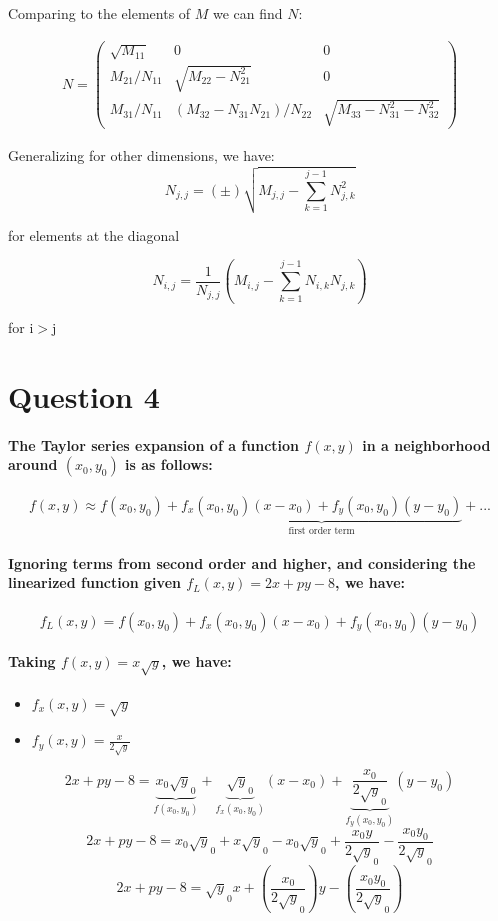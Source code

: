 \documentclass[a4paper]{article}    %
\begin{document}
Comparing to the elements of $M$ we can find $N$:

\begin{align*}
    N = 
    \begin{pmatrix} \sqrt{M_{11}} &  0 & 0  \\
    M_{21}/N_{11} & \sqrt{M_{22} - N_{21}^2} & 0 \\
    M_{31}/N_{11} &  \left( M_{32} - N_{31}N_{21} \right) /N_{22}  &\sqrt{M_{33}- N_{31}^2 - N_{32}^2}
    \end{pmatrix}
\end{align*}

Generalizing for other dimensions, we have:
\[\boxed{N_{j,j} = (\pm)\sqrt{ M_{j,j} - \sum_{k=1}^{j-1} N_{j,k}^2 }}\]
\begin{center}for elements at the diagonal\end{center}

\[\boxed{N_{i,j} = \frac{1}{N_{j,j}} \left( M_{i,j} - \sum_{k=1}^{j-1} N_{i,k} N_{j,k} \right)}\]
\begin{center}for i$>$j\end{center}


\newpage

\section*{Question 4}

\paragraph{The Taylor series expansion of a function $f(x,y)$ in a neighborhood around $(x_0,y_0)$ is as follows:}
    \[f(x,y) \approx f(x_0,y_0) + \underbrace{f_x(x_0,y_0)(x-x_0)+f_y(x_0,y_0)(y-y_0)}_{\text{first order term}} + ...\]

\paragraph{Ignoring terms from second order and higher, and considering the linearized function given $f_L(x,y)=2x+py-8$, we have:}
    \[f_L(x,y) = f(x_0,y_0) + f_x(x_0,y_0)(x-x_0)+f_y(x_0,y_0)(y-y_0)\]

\paragraph{Taking $f(x,y) = x\sqrt y$, we have:}
\begin{itemize}
    \item $f_x(x,y) = \sqrt y$
    \item $f_y(x,y) = \frac{x}{2\sqrt y}$
\end{itemize}
    \[2x+py-8 = \underbrace{x_0\sqrt y_0}_{f(x_0,y_0)} + \underbrace{\sqrt y_0}_{f_x(x_0,y_0)}(x-x_0) + \underbrace{\frac{x_0}{2\sqrt y_0}}_{f_y(x_0,y_0)}(y-y_0)\]
    \[2x+py-8 = x_0\sqrt y_0 + x\sqrt y_0 - x_0\sqrt y_0 + \frac{x_0 y}{2\sqrt y_0} - \frac{x_0 y_0}{2\sqrt y_0}\]
    \[2x+py-8 =  \sqrt y_0 x + \left(\frac{x_0}{2\sqrt y_0}\right) y - \left(\frac{x_0 y_0}{2\sqrt y_0}\right)\]
    
\end{document}

